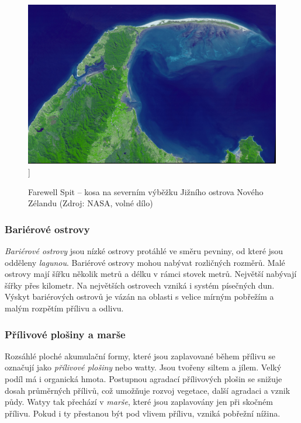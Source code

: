 \begin{figure}[h]
	\centering
	\includegraphics[width=1\linewidth]{obrazky/marine/kosa}]
	\caption{Farewell Spit -- kosa na severním výběžku Jižního ostrova Nového Zélandu (Zdroj: NASA, volné dílo)}
	\label{fig:kosa}
\end{figure}

\subsubsection{Bariérové ostrovy}
\emph{Bariérové ostrovy} jsou nízké ostrovy protáhlé ve směru pevniny, od které jsou odděleny \emph{lagunou}. Bariérové ostrovy mohou nabývat rozličných rozměrů. Malé ostrovy mají šířku několik metrů a délku v rámci stovek metrů. Největší nabývají šířky přes kilometr. Na největších ostrovech vzniká i systém písečných dun. Výskyt bariérových ostrovů je vázán na oblasti s velice mírným pobřežím a malým rozpětím přílivu a odlivu.

\subsubsection{Přílivové plošiny a marše}
Rozsáhlé ploché akumulační formy, které jsou zaplavované během přílivu se označují jako \emph{přílivové plošiny} nebo {watty}. Jsou tvořeny siltem a jílem. Velký podíl má i organická hmota. Postupnou agradací přílivových plošin se snižuje dosah průměrných přílivů, což umožňuje rozvoj vegetace, další agradaci a vznik půdy. Watyy tak přechází v \emph{marše}, které jsou zaplavovány jen při skočném přílivu. Pokud i ty přestanou být pod vlivem přílivu, vzniká pobřežní nížina. 

